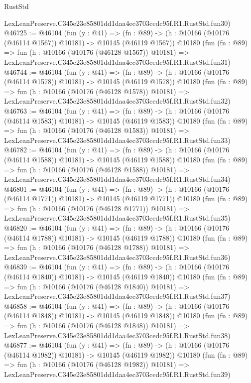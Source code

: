\begin{lexlean}{RustStd}
\begin{coremodule}
    LexLeanPreserve.C345e23e85801dd1daa4ec3703cedc95f.R1.RustStd.fun30)
@46725 := @46104
    (fun (y : @41) =>
    (fn : @89) -> (h : @10166 (@10176 (@46114 @1567)) @10181) -> @10145 (@46119 @1567))
    @10180
    (fun (fn : @89) =>
    fun (h : @10166 (@10176 (@46128 @1567)) @10181) =>
    LexLeanPreserve.C345e23e85801dd1daa4ec3703cedc95f.R1.RustStd.fun31)
@46744 := @46104
    (fun (y : @41) =>
    (fn : @89) -> (h : @10166 (@10176 (@46114 @1578)) @10181) -> @10145 (@46119 @1578))
    @10180
    (fun (fn : @89) =>
    fun (h : @10166 (@10176 (@46128 @1578)) @10181) =>
    LexLeanPreserve.C345e23e85801dd1daa4ec3703cedc95f.R1.RustStd.fun32)
@46763 := @46104
    (fun (y : @41) =>
    (fn : @89) -> (h : @10166 (@10176 (@46114 @1583)) @10181) -> @10145 (@46119 @1583))
    @10180
    (fun (fn : @89) =>
    fun (h : @10166 (@10176 (@46128 @1583)) @10181) =>
    LexLeanPreserve.C345e23e85801dd1daa4ec3703cedc95f.R1.RustStd.fun33)
@46782 := @46104
    (fun (y : @41) =>
    (fn : @89) -> (h : @10166 (@10176 (@46114 @1588)) @10181) -> @10145 (@46119 @1588))
    @10180
    (fun (fn : @89) =>
    fun (h : @10166 (@10176 (@46128 @1588)) @10181) =>
    LexLeanPreserve.C345e23e85801dd1daa4ec3703cedc95f.R1.RustStd.fun34)
@46801 := @46104
    (fun (y : @41) =>
    (fn : @89) -> (h : @10166 (@10176 (@46114 @1771)) @10181) -> @10145 (@46119 @1771))
    @10180
    (fun (fn : @89) =>
    fun (h : @10166 (@10176 (@46128 @1771)) @10181) =>
    LexLeanPreserve.C345e23e85801dd1daa4ec3703cedc95f.R1.RustStd.fun35)
@46820 := @46104
    (fun (y : @41) =>
    (fn : @89) -> (h : @10166 (@10176 (@46114 @1788)) @10181) -> @10145 (@46119 @1788))
    @10180
    (fun (fn : @89) =>
    fun (h : @10166 (@10176 (@46128 @1788)) @10181) =>
    LexLeanPreserve.C345e23e85801dd1daa4ec3703cedc95f.R1.RustStd.fun36)
@46839 := @46104
    (fun (y : @41) =>
    (fn : @89) -> (h : @10166 (@10176 (@46114 @1840)) @10181) -> @10145 (@46119 @1840))
    @10180
    (fun (fn : @89) =>
    fun (h : @10166 (@10176 (@46128 @1840)) @10181) =>
    LexLeanPreserve.C345e23e85801dd1daa4ec3703cedc95f.R1.RustStd.fun37)
@46858 := @46104
    (fun (y : @41) =>
    (fn : @89) -> (h : @10166 (@10176 (@46114 @1848)) @10181) -> @10145 (@46119 @1848))
    @10180
    (fun (fn : @89) =>
    fun (h : @10166 (@10176 (@46128 @1848)) @10181) =>
    LexLeanPreserve.C345e23e85801dd1daa4ec3703cedc95f.R1.RustStd.fun38)
@46877 := @46104
    (fun (y : @41) =>
    (fn : @89) -> (h : @10166 (@10176 (@46114 @1982)) @10181) -> @10145 (@46119 @1982))
    @10180
    (fun (fn : @89) =>
    fun (h : @10166 (@10176 (@46128 @1982)) @10181) =>
    LexLeanPreserve.C345e23e85801dd1daa4ec3703cedc95f.R1.RustStd.fun39)

\end{coremodule}
\end{lexlean}
